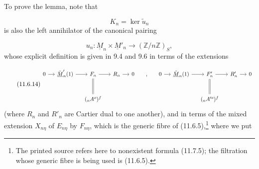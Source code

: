 
To prove the lemma, note that

\begin{equation*}
K_n=\ker\widetilde u_n
\end{equation*}
is also the left annihilator of the canonical pairing

\begin{equation*}
u_n:\underline M_n\times\underline M'_n
 \longrightarrow(\mathbb Z/n\mathbb Z)_S,
\end{equation*}
whose explicit definition is given in 9.4 and 9.6 in terms of the
extensions

\begin{equation}\tag{11.6.14}
\resizebox{\textwidth}{!}{%
\begin{tikzcd}[ampersand replacement=\&, column sep=small, row sep=large]
0 \arrow[r]
 \& {\ensuremath{\check{\underline M}'_n(1)}} \arrow[r]
 \& F_n \arrow[r] \arrow[d, equal]
 \& R_n \arrow[r]
 \& 0
 \& {,}
 \& 0 \arrow[r]
 \& {\ensuremath{\check{\underline M}_n(1)}} \arrow[r]
 \& F'_n \arrow[r] \arrow[d, equal]
 \& R'_n \arrow[r]
 \& 0 \\
{}
 \& {}
 \& ({}_nA^o)^f
 \& {}
 \& {}
 \& {}
 \& {}
 \& {}
 \& ({}_nA'^o)^f
 \& {}
 \& {}
\end{tikzcd}}
\end{equation}
(where $R_n$ and $R'_n$ are Cartier dual to one another), and in terms
of the mixed extension $X_{n\eta}$ of $E_{n\eta}$ by $F_{n\eta}$,
which is the generic fibre of (11.6.5),\footnote{The printed source
refers here to nonexistent formula (11.7.5); the filtration whose
generic fibre is being used is (11.6.5).} where we put

